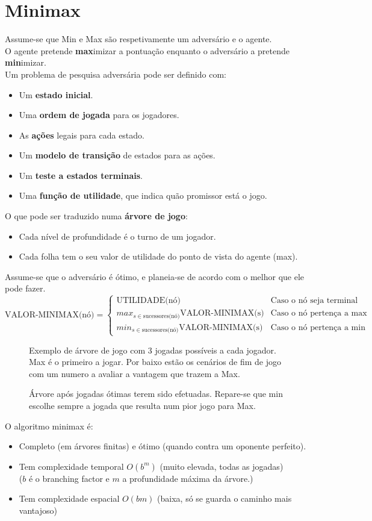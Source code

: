 \documentclass[]{report}
\begin{document}
\section{Minimax}
Assume-se que Min e Max são respetivamente um adversário e o agente.\\
O agente pretende \textbf{max}imizar a pontuação enquanto o adversário a pretende \textbf{min}imizar.\\
Um problema de pesquisa adversária pode ser definido com:
\begin{itemize}
	\item Um \textbf{estado inicial}.
	\item Uma \textbf{ordem de jogada} para os jogadores.
	\item As \textbf{ações} legais para cada estado.
	\item Um \textbf{modelo de transição} de estados para as ações.
	\item Um \textbf{teste a estados terminais}.
	\item Uma \textbf{função de utilidade}, que indica quão promissor está o jogo.
\end{itemize}
O que pode ser traduzido numa \textbf{árvore de jogo}:
\begin{itemize}
	\item Cada nível de profundidade é o turno de um jogador.
	\item Cada folha tem o seu valor de utilidade do ponto de vista do agente (max).
\end{itemize}
Assume-se que o adversário é ótimo, e planeia-se de acordo com o melhor que ele pode fazer.
$$\text{VALOR-MINIMAX(nó)} =
\begin{cases}
	\text{UTILIDADE(nó)} & \text{Caso o nó seja terminal}\\
	max_{s \in \text{sucessores(nó)}} \text{VALOR-MINIMAX(s)}& \text{Caso o nó pertença a max}\\
	min_{s \in \text{sucessores(nó)}} \text{VALOR-MINIMAX(s)}& \text{Caso o nó pertença a min}
\end{cases}$$
\begin{figure}[ht]
\begin{center}
	
	\caption{Exemplo de árvore de jogo com 3 jogadas possíveis a cada jogador. Max é o primeiro a jogar. Por baixo estão os cenários de fim de jogo com um numero a avaliar a vantagem que trazem a Max.}

\caption{Árvore após jogadas ótimas terem sido efetuadas. Repare-se que min escolhe sempre a jogada que resulta num pior jogo para Max.}
\end{center}
\end{figure}
O algoritmo minimax é:
\begin{itemize}
	\item Completo (em árvores finitas) e ótimo (quando contra um oponente perfeito).
	\item Tem complexidade temporal $O(b^m)$ (muito elevada, todas as jogadas)\\
	($b$ é o branching factor e $m$ a profundidade máxima da árvore.)
	\item Tem complexidade espacial $O(bm)$ (baixa, só se guarda o caminho mais vantajoso)
\end{itemize}
\clearpage
\end{document}
